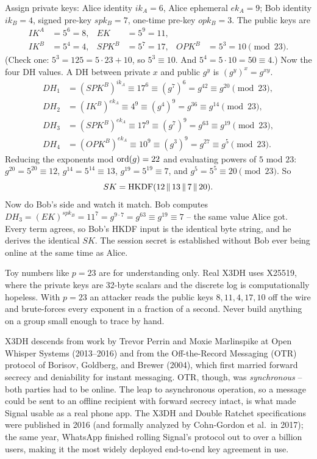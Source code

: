Assign private keys: Alice identity $ik_A = 6$, Alice ephemeral $ek_A = 9$; Bob identity $ik_B = 4$, signed pre-key $spk_B = 7$, one-time pre-key $opk_B = 3$. The public keys are
\[
\begin{aligned}
IK^A &= 5^6 = 8, & EK &= 5^9 = 11,\\
IK^B &= 5^4 = 4, & SPK^B &= 5^7 = 17, & OPK^B &= 5^3 = 10 \pmod{23}.
\end{aligned}
\]
(Check one: $5^3 = 125 = 5\cdot23 + 10$, so $5^3 \equiv 10$. And $5^4 = 5\cdot10 = 50 \equiv 4$.) Now the four DH values. A DH between private $x$ and public $g^y$ is $(g^y)^x = g^{xy}$.
\begin{align*}
DH_1 &= (SPK^B)^{ik_A} \equiv 17^{6} \equiv (g^7)^6 = g^{42} \equiv g^{20} \pmod{23},\\
DH_2 &= (IK^B)^{ek_A} \equiv 4^{9} \equiv (g^4)^9 = g^{36} \equiv g^{14} \pmod{23},\\
DH_3 &= (SPK^B)^{ek_A} \equiv 17^{9} \equiv (g^7)^9 = g^{63} \equiv g^{19} \pmod{23},\\
DH_4 &= (OPK^B)^{ek_A} \equiv 10^{9} \equiv (g^3)^9 = g^{27} \equiv g^{5} \pmod{23}.
\end{align*}
Reducing the exponents mod $\operatorname{ord}(g)=22$ and evaluating powers of $5$ mod $23$: $g^{20}=5^{20}\equiv 12$, $g^{14}=5^{14}\equiv 13$, $g^{19}=5^{19}\equiv 7$, and $g^{5}=5^{5}\equiv 20 \pmod{23}$. So
\[
SK = \mathrm{HKDF}(12 \,\|\, 13 \,\|\, 7 \,\|\, 20).
\]
Now do Bob's side and watch it match. Bob computes $DH_3 = (EK)^{spk_B} = 11^{7} = g^{9\cdot 7} = g^{63} \equiv g^{19} \equiv 7$ -- the same value Alice got. Every term agrees, so Bob's HKDF input is the identical byte string, and he derives the identical $SK$. The session secret is established without Bob ever being online at the same time as Alice.

\begin{trapbox}
Toy numbers like $p=23$ are for understanding only. Real X3DH uses X25519, where the private keys are 32-byte scalars and the discrete log is computationally hopeless. With $p=23$ an attacker reads the public keys $8, 11, 4, 17, 10$ off the wire and brute-forces every exponent in a fraction of a second. Never build anything on a group small enough to trace by hand.
\end{trapbox}

\begin{historybox}
X3DH descends from work by Trevor Perrin and Moxie Marlinspike at Open Whisper Systems (2013--2016) and from the Off-the-Record Messaging (OTR) protocol of Borisov, Goldberg, and Brewer (2004), which first married forward secrecy and deniability for instant messaging. OTR, though, was \emph{synchronous} -- both parties had to be online. The leap to asynchronous operation, so a message could be sent to an offline recipient with forward secrecy intact, is what made Signal usable as a real phone app. The X3DH and Double Ratchet specifications were published in 2016 (and formally analyzed by Cohn-Gordon et al.\ in 2017); the same year, WhatsApp finished rolling Signal's protocol out to over a billion users, making it the most widely deployed end-to-end key agreement in use.
\end{historybox}

